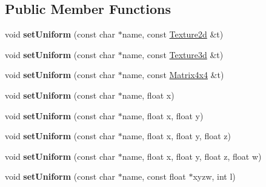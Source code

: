 \subsection*{Public Member Functions}
\begin{DoxyCompactItemize}
\item 
\hypertarget{class_tempest_1_1_shader_a37ce3e3d848fc4e61e499948e6435fd9}{void {\bfseries set\+Uniform} (const char $\ast$name, const \hyperlink{class_tempest_1_1_texture2d}{Texture2d} \&t)}\label{class_tempest_1_1_shader_a37ce3e3d848fc4e61e499948e6435fd9}

\item 
\hypertarget{class_tempest_1_1_shader_a230aeaefa202f1efecddf81030f89c71}{void {\bfseries set\+Uniform} (const char $\ast$name, const \hyperlink{class_tempest_1_1_texture3d}{Texture3d} \&t)}\label{class_tempest_1_1_shader_a230aeaefa202f1efecddf81030f89c71}

\item 
\hypertarget{class_tempest_1_1_shader_a3fbacc97218f5c0f298e1ac5f699d47b}{void {\bfseries set\+Uniform} (const char $\ast$name, const \hyperlink{class_tempest_1_1_matrix4x4}{Matrix4x4} \&t)}\label{class_tempest_1_1_shader_a3fbacc97218f5c0f298e1ac5f699d47b}

\item 
\hypertarget{class_tempest_1_1_shader_a2e9bebdcac305ab93f0504618abf5402}{void {\bfseries set\+Uniform} (const char $\ast$name, float x)}\label{class_tempest_1_1_shader_a2e9bebdcac305ab93f0504618abf5402}

\item 
\hypertarget{class_tempest_1_1_shader_a61e21e9f5fd1e63e74e752afda7bd14e}{void {\bfseries set\+Uniform} (const char $\ast$name, float x, float y)}\label{class_tempest_1_1_shader_a61e21e9f5fd1e63e74e752afda7bd14e}

\item 
\hypertarget{class_tempest_1_1_shader_a5ea197372aca91959b911ce2966dd002}{void {\bfseries set\+Uniform} (const char $\ast$name, float x, float y, float z)}\label{class_tempest_1_1_shader_a5ea197372aca91959b911ce2966dd002}

\item 
\hypertarget{class_tempest_1_1_shader_a2be0aab690b67c254eb83dbd44f5ff96}{void {\bfseries set\+Uniform} (const char $\ast$name, float x, float y, float z, float w)}\label{class_tempest_1_1_shader_a2be0aab690b67c254eb83dbd44f5ff96}

\item 
\hypertarget{class_tempest_1_1_shader_a995f2b6ce7fa267260815711d31470a2}{void {\bfseries set\+Uniform} (const char $\ast$name, const float $\ast$xyzw, int l)}\label{class_tempest_1_1_shader_a995f2b6ce7fa267260815711d31470a2}


\end{DoxyCompactItemize}
